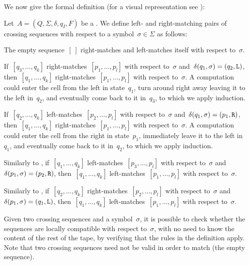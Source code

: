 We now give the formal definition (for a visual representation see ):
\begin{defn}\label{def:crossmatch2DFA}
	Let~$A=(Q,\Sigma,\delta,q_I,F)$ be a \TDFA.
	We define left- and right-matching pairs of crossing sequences with respect to a symbol~$\sigma\in\Sigma$ as follows:
	\begin{rules}
		\item \label{itm:crossmatch2DFA-1} The empty sequence~$[~]$ right-matches and left-matches itself with respect to~$\sigma$.
		\item \label{itm:crossmatch2DFA-2} If~$[q_3,\dots,q_k]$ right-matches~$[p_1,\dots,p_l]$ with respect to~$\sigma$ and~$\delta(q_1,\sigma)=(q_2,\mathtt L)$, then~$[q_1,\dots,q_k]$ right-matches~$[p_1,\dots,p_l]$ with respect to~$\sigma$.
		A computation could enter the cell from the left in state~$q_1$, turn around right away leaving it to the left in~$q_2$, and eventually come back to it in~$q_3$, to which we apply induction.
		\item \label{itm:crossmatch2DFA-3} If~$[q_2,\dots,q_k]$ left-matches~$[p_2,\dots,p_l]$ with respect to~$\sigma$ and~$\delta(q_1,\sigma)=(p_1,\mathtt R)$, then~$[q_1,\dots,q_k]$ right-matches~$[p_1,\dots,p_l]$ with respect to~$\sigma$.
		A computation could enter the cell from the right in state~$p_1$, immediately leave it to the left in~$q_1$, and eventually come back to it in~$q_2$, to which we apply induction.
		\item \label{itm:crossmatch2DFA-4} Similarly to , if~$[q_1,\dots,q_k]$ left-matches~$[p_3,\dots,p_l]$ with respect to~$\sigma$ and~$\delta(p_1,\sigma)=(p_2,\mathtt R)$, then~$[q_1,\dots,q_k]$ left-matches~$[p_1,\dots,p_l]$ with respect to~$\sigma$.
		\item \label{itm:crossmatch2DFA-5} Similarly to , if~$[q_2,\dots,q_k]$ right-matches~$[p_2,\dots,p_l]$ with respect to~$\sigma$ and~$\delta(p_1,\sigma)=(q_1,\mathtt L)$, then~$[q_1,\dots,q_k]$ left-matches~$[p_1,\dots,p_l]$ with respect to~$\sigma$.
	\end{rules}
\end{defn}
Given two crossing sequences and a symbol~$\sigma$, it is possible to check whether the sequences are locally compatible with respect to~$\sigma$, with no need to know the content of the rest of the tape, by verifying that the rules in the definition apply.
Note that two crossing sequences need not be valid in order to match (\eg the empty sequence).

